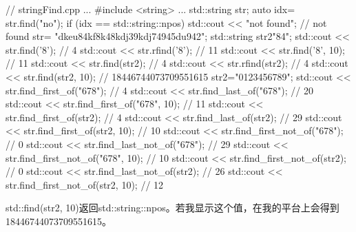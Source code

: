 
\begin{cpp}
// stringFind.cpp
...
#include <string>
...
std::string str;
auto idx= str.find("no");
if (idx == std::string::npos) std::cout << "not found"; // not found
str= {"dkeu84kf8k48kdj39kdj74945du942"};
std::string str2{"84"};
std::cout << str.find('8'); // 4
std::cout << str.rfind('8'); // 11
std::cout << str.find('8', 10); // 11
std::cout << str.find(str2); // 4
std::cout << str.rfind(str2); // 4
std::cout << str.find(str2, 10); // 18446744073709551615
str2="0123456789";
std::cout << str.find_first_of("678"); // 4
std::cout << str.find_last_of("678"); // 20
std::cout << str.find_first_of("678", 10); // 11
std::cout << str.find_first_of(str2); // 4
std::cout << str.find_last_of(str2); // 29
std::cout << str.find_first_of(str2, 10); // 10
std::cout << str.find_first_not_of("678"); // 0
std::cout << str.find_last_not_of("678"); // 29
std::cout << str.find_first_not_of("678", 10); // 10
std::cout << str.find_first_not_of(str2); // 0
std::cout << str.find_last_not_of(str2); // 26
std::cout << str.find_first_not_of(str2, 10); // 12
\end{cpp}

std::find(str2, 10)返回std::string::npos。若我显示这个值，在我的平台上会得到18446744073709551615。












